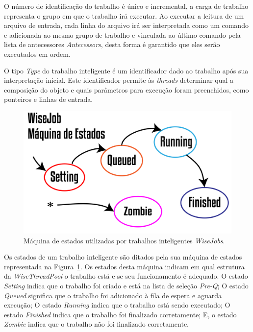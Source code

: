 O número de identificação do trabalho é único e incremental, a carga de trabalho representa o grupo em que o trabalho irá executar. Ao executar a leitura de um arquivo de entrada, cada linha do arquivo irá ser interpretada como um comando e adicionada ao mesmo grupo de trabalho e vinculada ao último comando pela lista de antecessores \textit{Antecessors}, desta forma é garantido que eles serão executados em ordem.

O tipo \textit{Type} do trabalho inteligente é um identificador dado ao trabalho após sua interpretação inicial. Este identificador permite às \textit{threads} determinar qual a composição do objeto e quais parâmetros para execução foram preenchidos, como ponteiros e linhas de entrada. 

\begin{figure}[!htbp]
	\centering
	\includegraphics[width=\linewidth]{Figures/WiseJobStatus@16x.png}
	\caption{Máquina de estados utilizadas por trabalhos inteligentes \textit{WiseJobs}.}
	\label{fig9:wise_jobs}
\end{figure}

Os estados de um trabalho inteligente são ditados pela sua máquina de estados representada na Figura~\ref{fig9:wise_jobs}. Os estados desta máquina indicam em qual estrutura da \textit{WiseThreadPool} o trabalho está e se seu funcionamento é adequado. O estado \textit{Setting} indica que o trabalho foi criado e está na lista de seleção \textit{Pre-Q}; O estado \textit{Queued} significa que o trabalho foi adicionado à fila de espera e aguarda execução; O estado \textit{Running} indica que o trabalho está sendo executado; O estado \textit{Finished} indica que o trabalho foi finalizado corretamente; E, o estado \textit{Zombie} indica que o trabalho não foi finalizado corretamente. 

